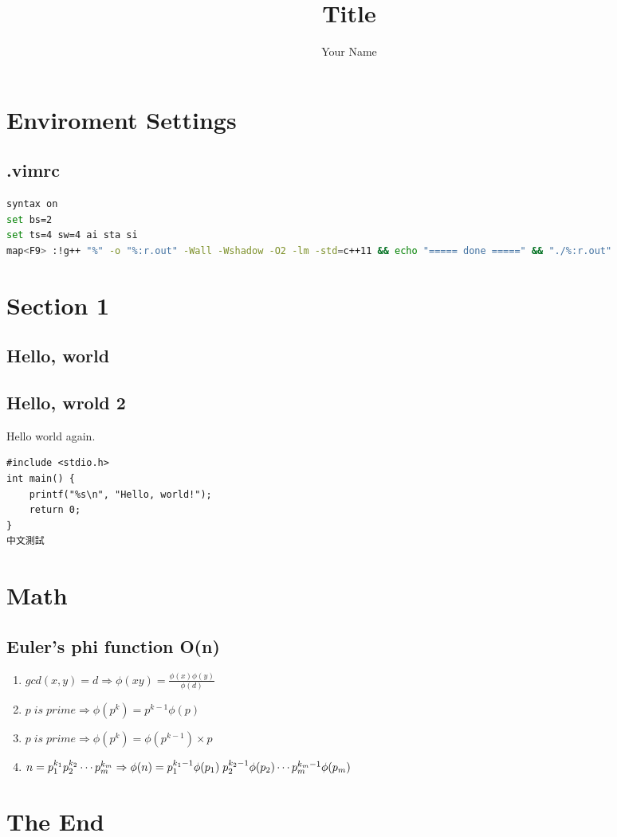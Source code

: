 \documentclass[11pt,twocolumn,a4paper]{article}
\title{Title}
\author{Your Name}
\begin{document}
\setlength{\headheight}{30pt}
\pagestyle{fancy}
\fancyhead[R]{\thepage}
\fancyfoot{}


\renewcommand{\contentsname}{Index}
\tableofcontents


\newpage
\section{Enviroment Settings}
\subsection{.vimrc}
\begin{lstlisting}[label=.vimrc,language=bash]
syntax on
set bs=2
set ts=4 sw=4 ai sta si
map<F9> :!g++ "%" -o "%:r.out" -Wall -Wshadow -O2 -lm -std=c++11 && echo "===== done =====" && "./%:r.out"
\end{lstlisting}


\newpage
\section{Section 1}

\subsection{Hello, world}


\subsection{Hello, wrold 2}
Hello world again.
\begin{lstlisting}[label=test]
#include <stdio.h>
int main() {
	printf("%s\n", "Hello, world!");
	return 0;
}
中文測試
\end{lstlisting}


\newpage
\section{Math}
\subsection{Euler's phi function O(n)}
\begin{enumerate}[1.]
\item $gcd(x,y)=d \Rightarrow \phi(xy) = \frac{\phi(x) \phi(y)}{\phi(d)}$
\item $p\; is\; prime \Rightarrow \phi(p^k) = p^{k-1} \phi(p)$
\item $p\; is\; prime \Rightarrow \phi(p^k) = \phi(p^{k-1}) \times p$
\item $n = p_{1}^{k_1} p_{2}^{k_2} \cdots p_{m}^{k_m}\\
\Rightarrow \phi(n) = p_{1}^{k_1-1}\phi(p_1)\; p_{2}^{k_2-1}\phi(p_2) \cdots p_{m}^{k_m-1}\phi(p_m)$
\end{enumerate}

\section*{The End}
\end{document}
